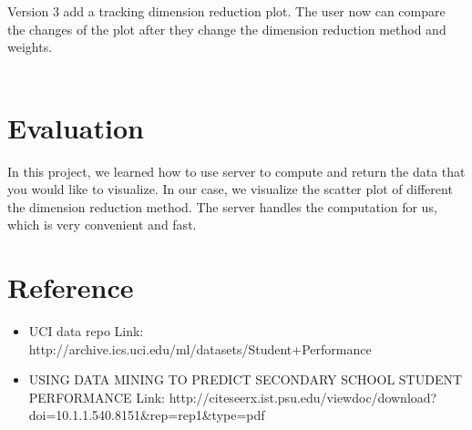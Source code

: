 \documentclass{article}
\begin{document}
Version 3 add a tracking dimension reduction plot. The user now can compare the changes of the plot after they change the dimension reduction method and weights.\\\


\section{Evaluation}
In this project, we learned how to use server to compute and return the data that you would like to visualize. In our case, we visualize the scatter plot of different the dimension reduction method. The server handles the computation for us, which is very convenient and fast. 




\section{Reference}
\begin{itemize}
\item UCI data repo Link: {http://archive.ics.uci.edu/ml/datasets/Student+Performance}
\item  USING DATA MINING TO PREDICT SECONDARY SCHOOL STUDENT PERFORMANCE Link: {http://citeseerx.ist.psu.edu/viewdoc/download?doi=10.1.1.540.8151\&rep=rep1\&type=pdf}
\end{itemize}
\end{document}
